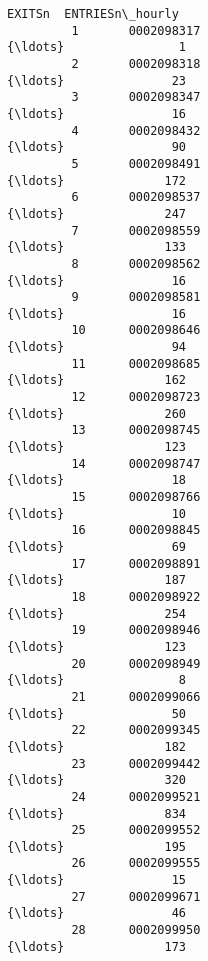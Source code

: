 \documentclass[11pt]{article}
\begin{document}
\begin{Verbatim}[commandchars=\\\{\}]
                                                            EXITSn  ENTRIESn\_hourly  
         1       0002098317                                    {\ldots}                1  
         2       0002098318                                    {\ldots}               23  
         3       0002098347                                    {\ldots}               16  
         4       0002098432                                    {\ldots}               90  
         5       0002098491                                    {\ldots}              172  
         6       0002098537                                    {\ldots}              247  
         7       0002098559                                    {\ldots}              133  
         8       0002098562                                    {\ldots}               16  
         9       0002098581                                    {\ldots}               16  
         10      0002098646                                    {\ldots}               94  
         11      0002098685                                    {\ldots}              162  
         12      0002098723                                    {\ldots}              260  
         13      0002098745                                    {\ldots}              123  
         14      0002098747                                    {\ldots}               18  
         15      0002098766                                    {\ldots}               10  
         16      0002098845                                    {\ldots}               69  
         17      0002098891                                    {\ldots}              187  
         18      0002098922                                    {\ldots}              254  
         19      0002098946                                    {\ldots}              123  
         20      0002098949                                    {\ldots}                8  
         21      0002099066                                    {\ldots}               50  
         22      0002099345                                    {\ldots}              182  
         23      0002099442                                    {\ldots}              320  
         24      0002099521                                    {\ldots}              834  
         25      0002099552                                    {\ldots}              195  
         26      0002099555                                    {\ldots}               15  
         27      0002099671                                    {\ldots}               46  
         28      0002099950                                    {\ldots}              173  

\end{Verbatim}
\end{document}
